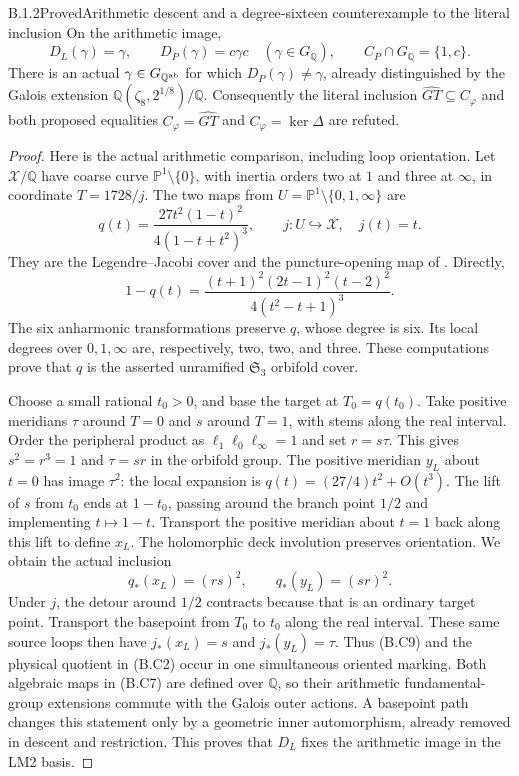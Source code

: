 \begin{result}{B.1.2}{Proved}{Arithmetic descent and a degree-sixteen counterexample to the literal inclusion}
On the arithmetic image,
\[
 D_L(\gamma)=\gamma,\qquad
 D_P(\gamma)=c\gamma c\quad(\gamma\in G_{\mathbb Q}),
 \qquad C_P\cap G_{\mathbb Q}=\{1,c\}.
 \tag{B.C6}
\]
There is an actual $\gamma\in G_{\mathbb Q^{\rm ab}}$
for which $D_P(\gamma)\ne\gamma$, already distinguished by
the Galois extension $\mathbb Q(\zeta_8,2^{1/8})/\mathbb Q$.
Consequently the literal inclusion
$\widehat{GT}\subseteq C_\varphi$ and both proposed
equalities $C_\varphi=\widehat{GT}$ and
$C_\varphi=\ker\Delta$ are refuted.
\end{result}
\begin{proof}
Here is the actual arithmetic comparison, including loop
orientation.  Let $\mathcal X/\mathbb Q$ have coarse curve
$\mathbb P^1\setminus\{0\}$, with inertia orders two at
$1$ and three at $\infty$, in coordinate $T=1728/j$.
The two maps from $U=\mathbb P^1\setminus\{0,1,\infty\}$
are
\[
 q(t)=\frac{27t^2(1-t)^2}{4(1-t+t^2)^3},\qquad
 j:U\hookrightarrow\mathcal X,\quad j(t)=t.
 \tag{B.C7}
\]
They are the Legendre--Jacobi cover and the puncture-opening
map of \cite[Section 2]{CA_NT2002}.  Directly,
\[
 1-q(t)=\frac{(t+1)^2(2t-1)^2(t-2)^2}
                    {4(t^2-t+1)^3}.
 \tag{B.C8}
\]
The six anharmonic transformations preserve $q$, whose
degree is six.  Its local degrees over $0,1,\infty$ are,
respectively, two, two, and three.  These computations prove
that $q$ is the asserted unramified $\mathfrak S_3$ orbifold
cover.

Choose a small rational $t_0>0$, and base the target at
$T_0=q(t_0)$.  Take positive meridians $\tau$ around $T=0$
and $s$ around $T=1$, with stems along the real interval.
Order the peripheral product as
$\ell_1\ell_0\ell_\infty=1$ and set $r=s\tau$.
This gives $s^2=r^3=1$ and $\tau=sr$ in the orbifold group.
The positive meridian $y_L$ about $t=0$ has image $\tau^2$:
the local expansion is $q(t)=(27/4)t^2+O(t^3)$.
The lift of $s$ from $t_0$ ends at $1-t_0$, passing around
the branch point $1/2$ and implementing $t\mapsto1-t$.
Transport the positive meridian about $t=1$ back along this
lift to define $x_L$.  The holomorphic deck involution
preserves orientation.  We obtain the actual inclusion
\[
             q_*(x_L)=(rs)^2,\qquad q_*(y_L)=(sr)^2.
 \tag{B.C9}
\]
Under $j$, the detour around $1/2$ contracts because that is
an ordinary target point.  Transport the basepoint from
$T_0$ to $t_0$ along the real interval.  These same source
loops then have $j_*(x_L)=s$ and $j_*(y_L)=\tau$.
Thus (B.C9) and the physical quotient in (B.C2) occur in
one simultaneous oriented marking.  Both algebraic maps in
(B.C7) are defined over $\mathbb Q$, so their arithmetic
fundamental-group extensions commute with the Galois outer
actions.  A basepoint path changes this statement only by a
geometric inner automorphism, already removed in descent and
restriction.  This proves that $D_L$ fixes the arithmetic
image in the LM2 basis.


\end{proof}
